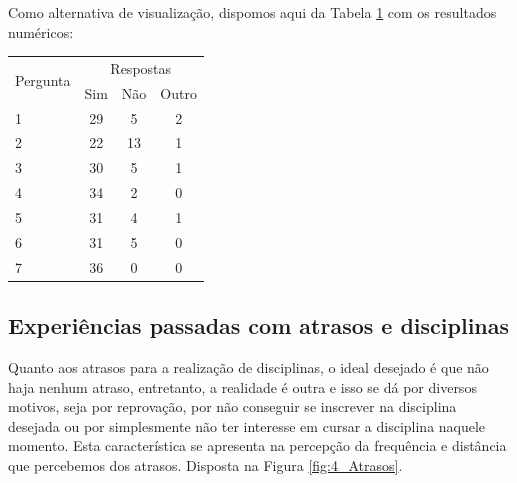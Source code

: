         Como alternativa de visualização, dispomos aqui da Tabela \ref{table:3_Preferencias} com os resultados numéricos:

        \begin{table}[]
            \centering
            \label{table:3_Preferencias}
            \begin{tabular}{@{}|lccc|@{}}
                \toprule
                \multicolumn{1}{|c|}{\multirow{2}{*}{Pergunta}} & \multicolumn{3}{c|}{Respostas}                              \\
                \multicolumn{1}{|c|}{}                          & \multicolumn{1}{c|}{Sim} & \multicolumn{1}{c|}{Não} & Outro \\ \midrule
                1                                               &                      29  &                        5 &     2 \\ \midrule
                2                                               &                      22  &                       13 &     1 \\ \midrule
                3                                               &                      30  &                        5 &     1 \\ \midrule
                4                                               &                      34  &                        2 &     0 \\ \midrule
                5                                               &                      31  &                        4 &     1 \\ \midrule
                6                                               &                      31  &                        5 &     0 \\ \midrule
                7                                               &                      36  &                        0 &     0 \\ \bottomrule
            \end{tabular}
        \end{table}

    \subsection{Experiências passadas com atrasos e disciplinas} %

        Quanto aos atrasos para a realização de disciplinas, o ideal desejado é que não haja nenhum atraso, entretanto, a realidade é outra e isso se dá por diversos motivos, seja por reprovação, por não conseguir se inscrever na disciplina desejada ou por simplesmente não ter interesse em cursar a disciplina naquele momento. Esta característica se apresenta na percepção da frequência e distância que percebemos dos atrasos. Disposta na Figura \ref{fig:4_Atrasos}.

